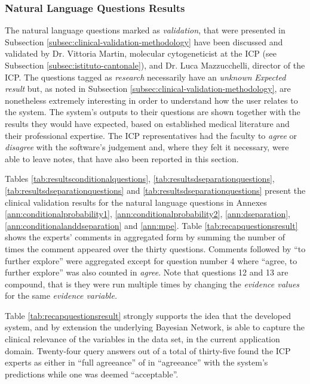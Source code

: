 \subsubsection{Natural Language Questions Results}
The natural language questions marked as \textit{validation}, that were presented in Subsection \ref{subsec:clinical-validation-methodology} have been discussed and validated by Dr. Vittoria Martin, molecular cytogeneticist at the ICP (see Subsection \ref{subsec:istituto-cantonale}), and Dr. Luca Mazzucchelli, director of the ICP. 
The questions tagged as \textit{research} necessarily have an \textit{unknown} \textit{Expected result} but, as noted in Subsection \ref{subsec:clinical-validation-methodology}, are nonetheless extremely interesting in order to understand how the user relates to the system.
The system's outputs to their questions are shown together with the results they would have expected, based on established medical literature and their professional expertise.
The ICP representatives had the faculty to \textit{agree} or \textit{disagree} with the software's judgement and, where they felt it necessary, were able to leave notes, that have also been reported in this section.

Tables \ref{tab:resultsconditionalquestions}, \ref{tab:resultsdseparationquestions}, \ref{tab:resultsdseparationquestions} and \ref{tab:resultsdseparationquestions} present the clinical validation results for the natural language questions in Annexes \ref{ann:conditionalprobability1}, \ref{ann:conditionalprobability2}, \ref{ann:dseparation}, \ref{ann:conditionalanddseparation} and \ref{ann:mpe}. 
Table \ref{tab:recapquestionsresult} shows the experts' comments in aggregated form by summing the number of times the comment appeared over the thirty questions.
Comments followed by \enquote{to further explore} were aggregated except for question number 4 where \enquote{agree, to further explore} was also counted in \textit{agree}.
Note that questions 12 and 13 are compound, that is they were run multiple times by changing the \textit{evidence values} for the same \textit{evidence variable.}

Table \ref{tab:recapquestionsresult} strongly supports the idea that the developed system, and by extension the underlying Bayesian Network, is able to capture the clinical relevance of the variables in the data set, in the current application domain.
Twenty-four query answers out of a total of thirty-five found the ICP experts as either in \enquote{full agreeance} of in \enquote{agreeance} with the system's predictions while one was deemed \enquote{acceptable}.

